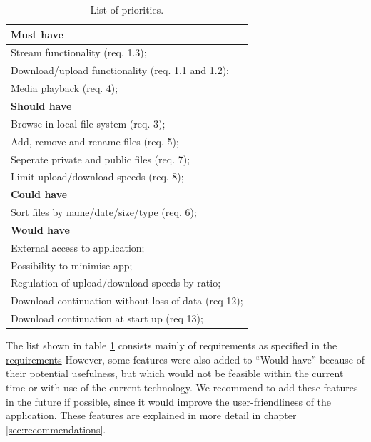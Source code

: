 \begin{table}[h!]
\centering
\begin{tabular}{|l|}
\hline
\textbf{Must have}\\ \hline
Stream functionality (req. 1.3); \\
Download/upload functionality (req. 1.1 and 1.2); \\
Media playback (req. 4); \\ \hline

\textbf{Should have}\\ \hline
Browse in local file system (req. 3); \\
Add, remove and rename files (req. 5); \\
Seperate private and public files (req. 7); \\
Limit upload/download speeds (req. 8); \\ \hline

\textbf{Could have}\\ \hline
Sort files by name/date/size/type (req. 6); \\ \hline

\textbf{Would have}\\ \hline
External access to application; \\
Possibility to minimise app; \\
Regulation of upload/download speeds by ratio; \\
Download continuation without loss of data (req 12); \\
Download continuation at start up (req 13); \\ \hline
\end{tabular}
\caption{List of priorities.}
\label{tab:MosCoW}
\end{table}

The list shown in table \ref{tab:MosCoW} consists mainly of requirements as specified in the 
\hyperref[sec:requirements]{requirements}
However, some features were also added to ``Would have'' because of their potential usefulness, but which would
not be feasible within the current time or with use of the current technology. We recommend to add these features in the future if possible,
 since it would improve the user-friendliness of the application. These features are explained in more detail in chapter \hyperref[sec:recommendations]{\ref{sec:recommendations}}.

